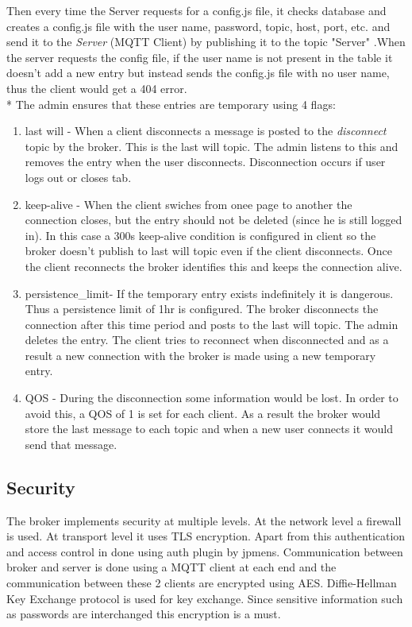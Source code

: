 \documentclass{report}
\begin{document}
Then every time the Server requests for a config.js file, it checks database and creates a config.js file with the user name, password, topic, host, port, etc. and send it to the \textit{Server} (MQTT Client) by publishing it to the topic "Server" .When the server requests the config file, if the user name is not present in the table it doesn't add a new entry but instead sends the config.js file with no user name, thus the client would get a 404 error.\\*
The admin ensures that these entries are temporary using 4 flags:
\begin{enumerate}
    \item last will - When a client disconnects a message is posted to the \textit{disconnect} topic by the broker. This is the last will topic. The admin listens to this and removes the entry when the user disconnects. Disconnection occurs if user logs out or closes tab.
    \item keep-alive - When the client swiches from onee page to another the connection closes, but the entry should not be deleted (since he is still logged in). In this case a 300s keep-alive condition is configured in client so the broker doesn't publish to last will topic even if the client disconnects. Once the client reconnects the broker identifies this and keeps the connection alive.
    \item persistence\_limit- If the temporary entry exists indefinitely it is dangerous. Thus a persistence limit of 1hr is configured. The broker disconnects the connection after this time period and posts to the last will topic. The admin deletes the entry. The client tries to reconnect when disconnected and as a result a new connection with the broker is made using a new temporary entry.
    \item QOS - During the disconnection some information would be lost. In order to avoid this, a QOS of 1 is set for each client. As a result the broker would store the last message to each topic and when a new user connects it would send that message.
\end{enumerate}

\subsection{Security}
The broker implements security at multiple levels. At the network level a firewall is used. At transport level it uses TLS encryption. Apart from this authentication and access control in done using auth plugin by jpmens. Communication between broker and server is done using a MQTT client at each end and the communication between these 2 clients are encrypted using AES. Diffie-Hellman Key Exchange protocol is used for key exchange. Since sensitive information such as passwords are interchanged this encryption is a must.
\end{document}
